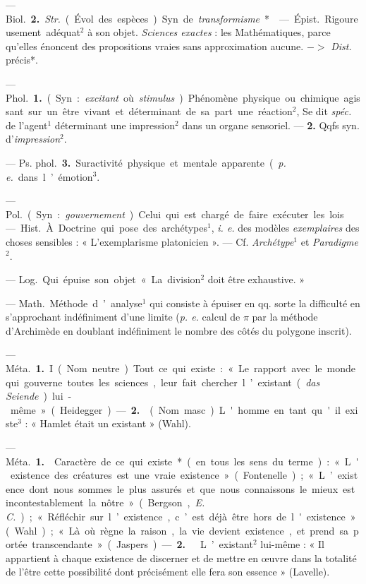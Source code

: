 \begin{itemize}[leftmargin=1cm, label=, itemsep=1pt]
— \si{Biol.} {\bf 2.} {\it Str.} (Évol. des espèces)
Syn. de {\it transformisme}*.

 — \si{Épist.} Rigoureusement adéquat$^2$ à son objet.
{\it Sciences exactes} :
les Mathématiques, parce qu'elles
énoncent des propositions vraies sans
approximation aucune. $->$ {\it Dist.}
précis*.

 — \si{Phol.} {\bf 1.} (Syn. : {\it excitant} où
{\it stimulus}). Phénomène physique ou chimique agissant sur un
être vivant et déterminant de sa part
une réaction$^2$, Se dit {\it spéc.} de l’agent$^1$
déterminant une impression$^2$ dans
un organe sensoriel. — {\bf 2.} Qqfs
syn. d’{\it impression}$^2$.

— \si{Ps. phol.} {\bf 3.} Suractivité physique et mentale apparente
({\it p. e.} dans l’émotion$^3$.

 — \si{Pol.} (Syn. : {\it gouvernement}).
Celui qui est chargé de faire exécuter les lois.

 — \si{Hist.} À. Doctrine
qui pose des archétypes$^1$, {\it i. e.} des
modèles {\it exemplaires} des choses sensibles : « L’exemplarisme platonicien ». — Cf. {\it Archétype}$^1$ et {\it Paradigme}$^2$.

 — \si{Log.} Qui épuise son
objet « La division$^2$ doit être exhaustive. »

 — \si{Math.} Méthode d’analyse$^1$
qui consiste à épuiser en qq.
sorte la difficulté en s’approchant
indéfiniment d’une limite ({\it p. e.} calcul
de $\pi$ par la méthode d’Archimède
en doublant indéfiniment le nombre
des côtés du polygone inscrit).

 — \si{Méta.} {\bf 1.} I (Nom neutre).
Tout ce qui existe : « Le rapport avec le monde qui gouverne
toutes les sciences, leur fait chercher l’existant
({\it das Seiende}) lui-même » (Heidegger). — {\bf 2.} 
(Nom masc.) L'homme en tant qu'il existe$^3$ : « Hamlet était
un existant » (Wahl).

 — \si{Méta.} {\bf 1.}  Caractère de
ce qui existe* (en tous les sens du
terme) : « L'existence des créatures
est une vraie existence. » (Fontenelle); « L’existence dont nous
sommes le plus assurés et que nous
connaissons le mieux est incontestablement la nôtre » (Bergson, {\it E. C.});
« Réfléchir sur l’existence, c’est déjà
être hors de l'existence » (Wahl);
« Là où règne la raison, la vie devient
existence, et prend sa portée transcendante » (Jaspers).
— {\bf 2.}  
L’existant$^2$ lui-même : « Il appartient
à chaque existence de discerner et de
mettre en œuvre dans la totalité de
l'être cette possibilité dont précisément elle fera son essence » (Lavelle).


\end{itemize}
